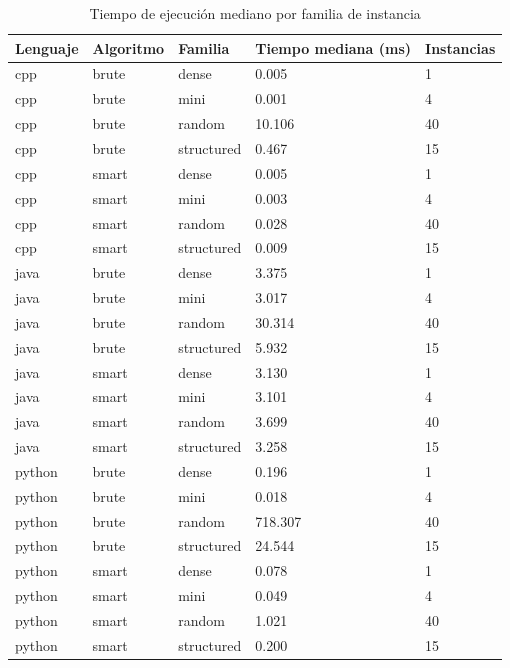 \begin{table}[htbp]
\centering
\caption{Tiempo de ejecuci\'on mediano por familia de instancia}
\label{tab:summary_by_family}
\begin{tabular}{lllll}
\toprule
Lenguaje & Algoritmo & Familia & Tiempo mediana (ms) & Instancias \\
\midrule
cpp & brute & dense & 0.005 & 1 \\
cpp & brute & mini & 0.001 & 4 \\
cpp & brute & random & 10.106 & 40 \\
cpp & brute & structured & 0.467 & 15 \\
cpp & smart & dense & 0.005 & 1 \\
cpp & smart & mini & 0.003 & 4 \\
cpp & smart & random & 0.028 & 40 \\
cpp & smart & structured & 0.009 & 15 \\
java & brute & dense & 3.375 & 1 \\
java & brute & mini & 3.017 & 4 \\
java & brute & random & 30.314 & 40 \\
java & brute & structured & 5.932 & 15 \\
java & smart & dense & 3.130 & 1 \\
java & smart & mini & 3.101 & 4 \\
java & smart & random & 3.699 & 40 \\
java & smart & structured & 3.258 & 15 \\
python & brute & dense & 0.196 & 1 \\
python & brute & mini & 0.018 & 4 \\
python & brute & random & 718.307 & 40 \\
python & brute & structured & 24.544 & 15 \\
python & smart & dense & 0.078 & 1 \\
python & smart & mini & 0.049 & 4 \\
python & smart & random & 1.021 & 40 \\
python & smart & structured & 0.200 & 15 \\
\bottomrule
\end{tabular}
\end{table}
